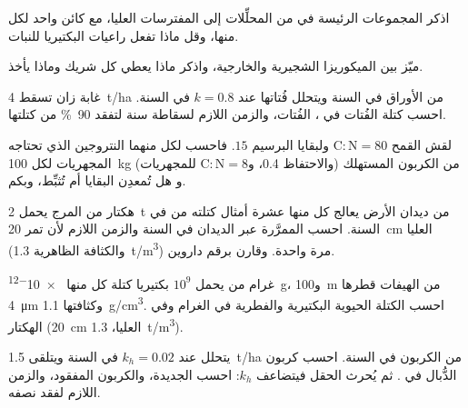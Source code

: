 \begin{exercise}[$\star$]\label{exo:b2:living-soil:3}
اذكر المجموعات الرئيسة في  من المحلِّلات إلى
المفترسات العليا، مع كائن واحد لكل منها، وقل ماذا تفعل راعيات
البكتيريا للنبات.
\end{exercise}

\begin{exercise}[$\star$]\label{exo:b2:living-soil:4}
ميّز بين الميكوريزا الشجيرية والخارجية، واذكر ماذا يعطي كل
شريك وماذا يأخذ.
\end{exercise}

\begin{exercise}[$\star\star$]\label{exo:b2:living-soil:5}
غابة زان تسقط \qty{4}{t/ha} من الأوراق في السنة ويتحلل فُتاتها
عند $k = 0.8$ في السنة. احسب كتلة الفُتات في ،
 الفُتات، والزمن اللازم لسقاطة سنة
لتفقد \qty{90}{\%} من كتلتها.
\end{exercise}

\begin{exercise}[$\star\star$]\label{exo:b2:living-soil:6}
لقش القمح $\mathrm{C:N} = 80$ ولبقايا البرسيم $15$. فاحسب لكل
منهما النتروجين الذي تحتاجه المجهريات لكل \qty{100}{kg} من
الكربون المستهلك (والاحتفاظ 0.4، و$\mathrm{C:N} = 8$ للمجهريات) و
هل تُمعدِن البقايا أم تُثبِّط، وبكم.
\end{exercise}

\begin{exercise}[$\star\star$]\label{exo:b2:living-soil:7}
هكتار من المرج يحمل \qty{2}{t} من ديدان الأرض يعالج كل منها
عشرة أمثال كتلته من  في السنة. احسب 
الممرَّرة عبر الديدان في السنة والزمن اللازم لأن تمر
\qty{20}{cm} العليا (والكثافة الظاهرية \qty{1.3}{t/m^3}) مرة واحدة.
وقارن برقم داروين.
\end{exercise}

\begin{exercise}[$\star\star$]\label{exo:b2:living-soil:8}
غرام من  يحمل $10^{9}$ بكتيريا كتلة كل منها \qty{e-12}{g}،
و\qty{100}{m} من الهيفات قطرها \qty{4}{\micro m} وكثافتها
\qty{1.1}{g/cm^3}. احسب الكتلة الحيوية البكتيرية والفطرية في
الغرام وفي الهكتار (\qty{20}{cm} العليا، \qty{1.3}{t/m^3}).
\end{exercise}

\begin{exercise}[$\star\star$]\label{exo:b2:living-soil:9}
يتحلل   عند $k_h = 0.02$ في السنة ويتلقى
\qty{1.5}{t/ha} من الكربون في السنة. احسب كربون الدُّبال في
. ثم يُحرث الحقل فيتضاعف $k_h$: احسب 
الجديدة، والكربون المفقود، والزمن اللازم لفقد نصفه.
\end{exercise}

